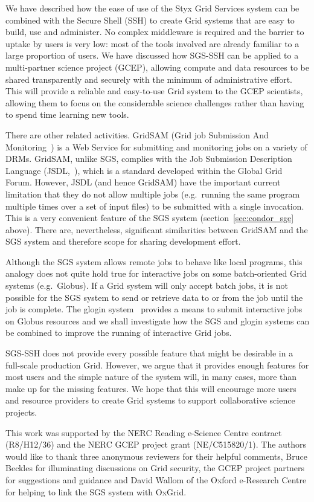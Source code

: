 \documentclass[times,10pt,twocolumn,8.5x11]{article}
\begin{document}
We have described how the ease of use of the Styx Grid Services system can be combined with the Secure Shell (SSH) to create Grid systems that are easy to build, use and administer.  No complex middleware is required and the barrier to uptake by users is very low: most of the tools involved are already familiar to a large proportion of users.  We have discussed how SGS-SSH can be applied to a multi-partner science project (GCEP), allowing compute and data resources to be shared transparently and securely with the minimum of administrative effort.  This will provide a reliable and easy-to-use Grid system to the GCEP scientists, allowing them to focus on the considerable science challenges rather than having to spend time learning new tools.

There are other related activities.  GridSAM (Grid job Submission And Monitoring~\cite{gridsam}) is a Web Service for submitting and monitoring jobs on a variety of DRMs.  GridSAM, unlike SGS, complies with the Job Submission Description Language (JSDL,~\cite{jsdl}), which is a standard developed within the Global Grid Forum.  However, JSDL (and hence GridSAM) have the important current limitation that they do not allow multiple jobs (e.g.\ running the same program multiple times over a set of input files) to be submitted with a single invocation. This is a very convenient feature of the SGS system (section~\ref{sec:condor_sge} above).  There are, nevertheless, significant similarities between GridSAM and the SGS system and therefore scope for sharing development effort.

Although the SGS system allows remote jobs to behave like local programs, this analogy does not quite hold true for interactive jobs on some batch-oriented Grid systems (e.g.\ Globus).  If a Grid system will only accept batch jobs, it is not possible for the SGS system to send or retrieve data to or from the job until the job is complete.  The glogin system~\cite{rosmanith:2004} provides a means to submit interactive jobs on Globus resources and we shall investigate how the SGS and glogin systems can be combined to improve the running of interactive Grid jobs.

SGS-SSH does not provide every possible feature that might be desirable in a full-scale production Grid.  However, we argue that it provides enough features for most users and the simple nature of the system will, in many cases, more than make up for the missing features.  We hope that this will encourage more users and resource providers to create Grid systems to support collaborative science projects.

This work was supported by the NERC Reading e-Science Centre contract (R8/H12/36) and the NERC GCEP project grant (NE/C515820/1).  The authors would like to thank three anonymous reviewers for their helpful comments, Bruce Beckles for illuminating discussions on Grid security, the GCEP project partners for suggestions and guidance and David Wallom of the Oxford e-Research Centre for helping to link the SGS system with OxGrid.



\end{document}
